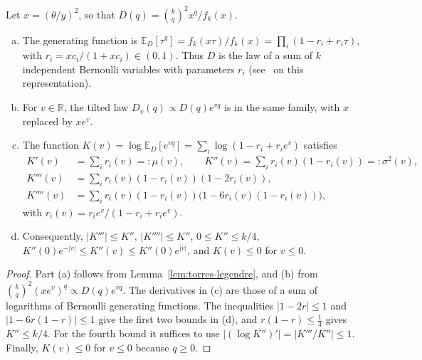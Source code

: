 \begin{corolario}\label{cor:torres-pb}
Let $x=(\theta/y)^2$, so that $D(q)=\binom kq^2x^q/f_k(x)$.
\begin{enumerate}[(a)]
\item The generating function is $\mathbb E_D[\tau^q]=f_k(x\tau)/f_k(x)=\prod_i(1-r_i+r_i\tau)$, with
 $r_i=xc_i/(1+xc_i)\in(0,1)$. Thus $D$ is the law of a sum of $k$ independent Bernoulli
 variables with parameters $r_i$ (see~\cite{Pitman} on this representation).
\item For $v\in\mathbb R$, the tilted law $D_v(q)\propto D(q)e^{vq}$ is in the same family, with $x$
 replaced by $xe^v$.
\item The function $K(v)=\log\mathbb E_D[e^{vq}]=\sum_i\log(1-r_i+r_ie^v)$ satisfies
 \[
 \begin{aligned}
  K'(v)&=\sum_ir_i(v)=:\mu(v),\qquad K''(v)=\sum_ir_i(v)(1-r_i(v))=:\sigma^2(v),\\
  K'''(v)&=\sum_ir_i(v)(1-r_i(v))(1-2r_i(v)),\\
  K''''(v)&=\sum_ir_i(v)(1-r_i(v))\bigl(1-6r_i(v)(1-r_i(v))\bigr),
 \end{aligned}
 \]
 with $r_i(v)=r_ie^v/(1-r_i+r_ie^v)$.
\item Consequently, $|K'''|\le K''$, $|K''''|\le K''$, $0\le K''\le k/4$,
 $K''(0)e^{-|v|}\le K''(v)\le K''(0)e^{|v|}$, and $K(v)\le0$ for $v\le0$.
\end{enumerate}
\end{corolario}
\begin{proof}
Part (a) follows from Lemma~\ref{lem:torres-legendre}, and (b) from $\binom kq^2(xe^v)^q\propto D(q)e^{vq}$.
The
derivatives in (c) are those of a sum of logarithms of Bernoulli generating functions. The
inequalities $|1-2r|\le1$ and $|1-6r(1-r)|\le1$ give the first two bounds in (d), and $r(1-r)\le\frac14$
gives
$K''\le k/4$. For the fourth bound it suffices to use $|(\log K'')'|=|K'''/K''|\le1$. Finally, $K(v)\le0$
for $v\le0$
because $q\ge0$.
\end{proof}

